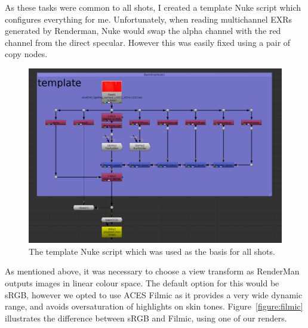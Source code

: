 \documentclass[11pt]{article}
\begin{document}
As these tasks were common to all shots, I created a template Nuke script which configures everything for me. Unfortunately, when reading multichannel EXRs generated by Renderman, Nuke would swap the alpha channel with the red channel from the direct specular. However this was easily fixed using a pair of copy nodes.

\begin{figure}[htbp]\centering
	\includegraphics[width=1.0\linewidth]{images/compTemplate.png}
	\caption{\label{figure:compTemplate} The template Nuke script which was used as the basis for all shots.}
\end{figure}

As mentioned above, it was necessary to choose a view transform as RenderMan outputs images in linear colour space. The default option for this would be sRGB, however we opted to use ACES Filmic as it provides a very wide dynamic range, and avoids oversaturation of highlights on skin tones. Figure~\ref{figure:filmic} illustrates the difference between sRGB and Filmic, using one of our renders.
\end{document}

